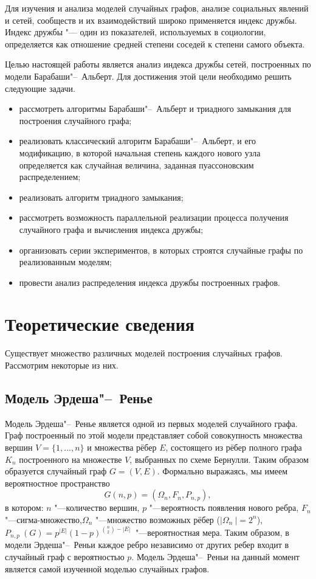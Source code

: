 \documentclass[bachelor, och, diploma]{SCWorks}
\begin{document}
Для изучения и анализа моделей случайных графов, анализе социальных явлений и сетей, сообществ и их взаимодействий широко применяется индекс дружбы. Индекс дружбы "--- один из показателей, используемых в социологии, определяется как отношение средней степени соседей к степени самого объекта. 

Целью настоящей работы является анализ индекса дружбы сетей, построенных по модели Барабаши"--~Альберт. Для достижения этой цели необходимо решить следующие задачи.
\begin{itemize}
\item рассмотреть алгоритмы Барабаши"--~Альберт и триадного замыкания для построения случайного графа;
\item реализовать классический алгоритм Барабаши"--~Альберт, и его модификацию, в которой начальная степень каждого нового узла определяется как случайная величина, заданная пуассоновским распределением;
\item реализовать алгоритм триадного замыкания;
\item рассмотреть возможность параллельной реализации процесса получения случайного графа и  вычисления индекса дружбы;
\item организовать серии экспериментов, в которых строятся случайные графы по реализованным моделям; 
\item провести анализ распределения индекса дружбы построенных графов.
\end{itemize}




\section{Теоретические сведения}

Существует множество различных моделей построения случайных графов. Рассмотрим некоторые из них.
\subsection{Модель Эрдеша"--~Ренье}
Модель Эрдеша"--~Ренье является одной из первых моделей случайного графа. Граф построенный по этой модели представляет собой совокупность множества вершин $ V=\{1,...,n\} $ и множества рёбер $ E $, состоящего из рёбер полного графа $ K_{n} $ построенного на множестве $ V $, выбранных по схеме Бернулли. Таким образом образуется случайный граф $ G=(V, E) $. Формально выражаясь, мы имеем вероятностное пространство
\[
G(n, p)=(\Omega_n, F_n, P_{n, p}),
\] 
в котором: $n$ "---количество вершин, $p$ "---вероятность появления нового ребра, $F_n$ "---сигма-множество,$ \Omega_n$ "---множество возможных рёбер ($ |\Omega_n\ |=2^n$),  $P_{n,p}\ (G)=p^{|E|} (1-p)^{\binom{n}{2}-|E|}\ $ "---вероятностная мера.
Таким образом, в модели Эрдеша"--~Реньи каждое ребро независимо от других ребер входит в случайный граф с вероятностью $p$. Модель Эрдеша"--~Реньи на данный момент является самой изученной моделью случайных графов\cite{rey2}.
\end{document}
